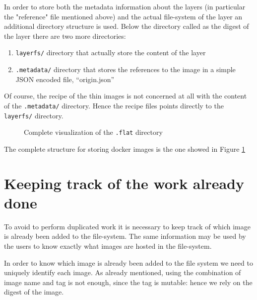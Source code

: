 In order to store both the metadata information about the layers (in particular
the "reference" file mentioned above) and the actual file-system of the layer
an additional directory structure is used. Below the directory called as the
digest of the layer there are two more directories: 
\begin{enumerate} 
        \item \texttt{layerfs/} directory that actually store the content of the layer
        \item \texttt{.metadata/} directory that stores the references to the image in a simple JSON encoded file, “origin.json”
\end{enumerate}

Of course, the recipe of the thin images is not concerned at all with the
content of the \texttt{.metadata/} directory.  Hence the recipe files points
directly to the \texttt{layerfs/} directory.

\begin{figure}
\caption{Complete visualization of the \texttt{.flat} directory}
\label{fig:docker-layer-structure}
\end{figure}

The complete structure for storing docker images is the one showed in Figure
\ref{fig:docker-layer-structure}

\section{Keeping track of the work already done}
\label{sec:methodology-keep-track}

To avoid to perform duplicated work it is necessary to keep track of which image
is already been added to the file-system. The same information may be used by
the users to know exactly what images are hosted in the file-system.

In order to know which image is already been added to the file system we need to uniquely
identify each image. As already mentioned, using the combination of image name
and tag is not enough, since the tag is mutable: hence we rely on the digest
of the image.

